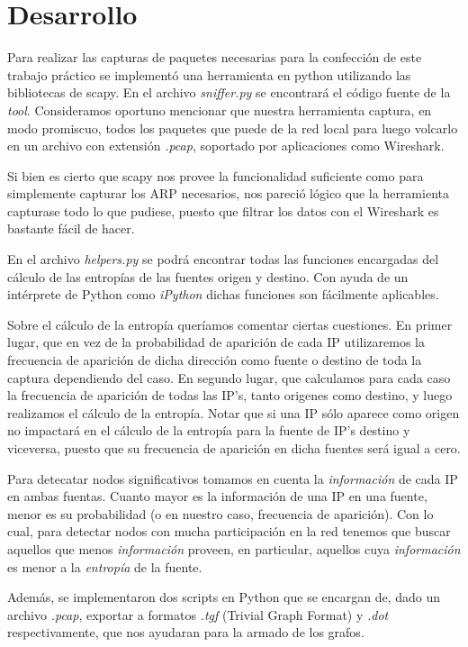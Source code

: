 \section{Desarrollo}

Para realizar las capturas de paquetes necesarias para la confección de este trabajo práctico se implementó una herramienta en python utilizando las bibliotecas de scapy. En el archivo \textit{sniffer.py} se encontrará el código fuente de la \textit{tool}. Consideramos oportuno mencionar que nuestra herramienta captura, en modo promiscuo, todos los paquetes que puede de la red local para luego volcarlo en un archivo con extensión \textit{.pcap}, soportado por aplicaciones como Wireshark.\newline

Si bien es cierto que scapy nos provee la funcionalidad suficiente como para simplemente capturar los ARP necesarios, nos pareció lógico que la herramienta capturase todo lo que pudiese, puesto que filtrar los datos con el Wireshark es bastante fácil de hacer.\newline

En el archivo \textit{helpers.py} se podrá encontrar todas las funciones encargadas del cálculo de las entropías de las fuentes origen y destino. Con ayuda de un intérprete de Python como \textit{iPython} dichas funciones son fácilmente aplicables.\newline

Sobre el cálculo de la entropía queríamos comentar ciertas cuestiones. En primer lugar, que en vez de la probabilidad de aparición de cada IP utilizaremos la frecuencia de aparición de dicha dirección como fuente o destino de toda la captura dependiendo del caso. En segundo lugar, que calculamos para cada caso la frecuencia de aparición de todas las IP's, tanto origenes como destino, y luego realizamos el cálculo de la entropía. Notar que si una IP sólo aparece como origen no impactará en el cálculo de la entropía para la fuente de IP's destino y viceversa, puesto que su frecuencia de aparición en dicha fuentes será igual a cero.\newline

Para detecatar nodos significativos tomamos en cuenta la \textit{información} de cada IP en ambas fuentas. Cuanto mayor es la información de una IP en una fuente, menor es su probabilidad (o en nuestro caso, frecuencia de aparición). Con lo cual, para detectar nodos con mucha participación en la red tenemos que buscar aquellos que menos \textit{información} proveen, en particular, aquellos cuya \textit{información} es menor a la \textit{entropía} de la fuente.\newline 

Además, se implementaron dos scripts en Python que se encargan de, dado un archivo \textit{.pcap}, exportar a formatos \textit{.tgf} (Trivial Graph Format) y \textit{.dot} respectivamente, que nos ayudaran para la armado de los grafos.\newline
